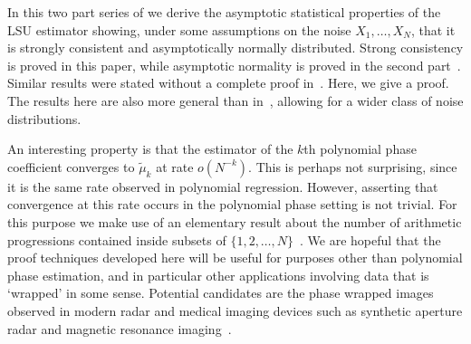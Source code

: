\documentclass[journal]{IEEEtran}
\begin{document}
In this two part series of we derive the asymptotic statistical properties of the LSU estimator showing, under some assumptions on the noise $X_1,\dots,X_N$, that it is strongly consistent and asymptotically normally distributed.  Strong consistency is proved in this paper, while asymptotic normality is proved in the second part~\cite{McKilliam_pps2_2012}.  Similar results were stated without a complete proof in~\cite{McKilliam_polyphase_est_icassp_2011}.  Here, we give a proof.  The results here are also more general than in~\cite{McKilliam_polyphase_est_icassp_2011}, allowing for a wider class of noise distributions.

An interesting property is that the estimator of the $k$th polynomial phase coefficient converges to $\tilde{\mu}_k$ at rate $o(N^{-k})$.  This is perhaps not surprising, since it is the same rate observed in polynomial regression.  However, asserting that convergence at this rate occurs in the polynomial phase setting is not trivial.  For this purpose we make use of an elementary result about the number of arithmetic progressions contained inside subsets of $\{1,2,\dots,N\}$~\cite{Erdos_on_some_sequence_of_integers1936,Szemeredi_setint_no_k_arth1975,Gowers_new_proof2001}.  %
We are hopeful that the proof techniques developed here will be useful for purposes other than polynomial phase estimation, and in particular other applications involving data that is `wrapped' in some sense.  Potential candidates are the phase wrapped images observed in modern radar and medical imaging devices such as synthetic aperture radar and magnetic resonance imaging~\cite{Nico_phaseunwrappingSAR_2000,Friedlander_PD_phaseunwrapping_1996}.
\end{document}
